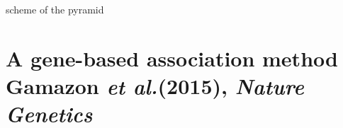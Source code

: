 \documentclass[aspectratio=169,12pt]{beamer}
\newcommand{\etal}{\textit{et al.}\xspace}
\begin{document}



\begin{frame}

	scheme of the pyramid

\end{frame}

\section{A gene-based association method \newline
\scriptsize Gamazon \etal (2015), \textit{Nature Genetics}}





\end{document}

